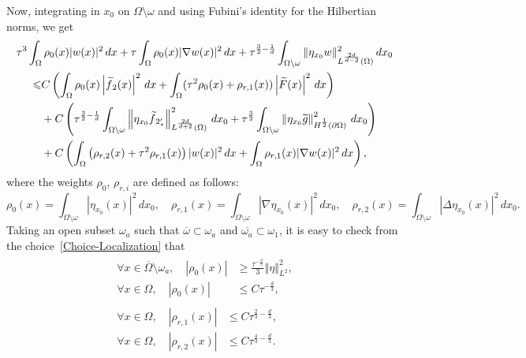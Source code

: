 \documentclass[10pt]{amsart}
\theoremstyle{definition}\newtheorem{defi}[theo]{Definition}\newtheorem{rema}[theo]{Remark}\newtheorem{exam}[theo]{Example}\newtheorem{exem}[theo]{Example}\newtheorem{nota}[theo]{Notation}
\newcommand{\norm}[1]{\left\Vert#1\right\Vert}
\renewcommand{\leq}{\leqslant}
\renewcommand{\geq}{\geqslant}
\renewcommand{\tilde}{\widetilde}
\let\oldtilde\tilde
\renewcommand*{\tilde}[1]{\mathchoice{\widetilde{#1}}{\widetilde{#1}}{\oldtilde{#1}}{\oldtilde{#1}}}
\let\oldforall\forall
\renewcommand*{\forall}{\mathrel{\oldforall}}
\begin{document}
Now, integrating in $x_0$ on $\Omega \setminus \omega$ and using Fubini's identity for the Hilbertian norms, we get
\begin{multline*}
\tau^3 \int_\Omega \rho_0(x) |w(x)|^2 \, dx +
\tau \int_\Omega \rho_0(x) |\nabla w(x)|^2 \, dx +
\tau^{\frac{3}{2}-\frac{1}{d}} \int_{\Omega \setminus \omega} \| \eta_{x_0} w \|_{L^{\frac{2d}{d-2}}(\Omega)}^2 \, dx_0
\\
\begin{aligned}
\leq&
C\left(
\int_\Omega \rho_0(x) \left|\tilde f_2(x)\right|^2\, dx +
\int_\Omega (\tau^2 \rho_0(x) + \rho_{r,1}(x)) \left|\tilde F(x)\right|^2\, dx
\right)
\\
&+ C
\left(
\tau^{\frac{3}{2}-\frac{1}{d}} \int_{\Omega \setminus \omega} \norm{\eta_{x_0} \tilde f_{2_*'} }_{L^{\frac{2d}{d+2}}(\Omega)}^2 \, dx_0 +
\tau^{\frac{3}{2}} \int_{\Omega \setminus \omega} \norm{ \eta_{x_0} \tilde g}_{H^{\frac{1}{2}}(\partial \Omega)}^2 \, dx_0
\right)
\\
& + C
\left(
\int_\Omega \left(\rho_{r,2}(x) + \tau^2 \rho_{r,1}(x)\right) |w(x)|^2 \, dx +
\int_\Omega \rho_{r,1}(x) |\nabla w(x)|^2 \, dx
\right),
\end{aligned}
\end{multline*}
where the weights $\rho_0$, $\rho_{r,i}$ are defined as follows:
\begin{equation*}
\rho_0(x) \!= \!\int_{\Omega \setminus \omega} \!\!\! |\eta_{x_0}(x)|^2 \, dx_0, \quad
\rho_{r,1}(x) \! =\! \int_{\Omega \setminus \omega} \!\!\!|\nabla \eta_{x_0}(x)|^2 \, dx_0,
\quad
\rho_{r,2}(x) \! = \!\int_{\Omega \setminus \omega}\!\!\! |\Delta \eta_{x_0}(x)|^2 \, dx_0.
\end{equation*}
Taking an open subset $\omega_a$ such that $\overline\omega \subset \omega_a$ and $\overline{\omega_a} \subset \omega_1$, it is easy to check from the choice~\eqref{Choice-Localization} that
\begin{align}
\begin{aligned}\label{Est-rho-0-above}
\forall x \in \overline{\Omega} \setminus \omega_a,\quad  |\rho_0(x) | &\geq \frac{\tau^{-\frac{d}{3}}}{3} \norm{\eta}_{L^2}^2,
\\
\forall x \in \Omega, \quad  |\rho_{0}(x)| &\leq C \tau^{- \frac{d}{3}},
\end{aligned}
\\
\begin{aligned}\label{Est-rho-2-above}
\forall x \in \Omega, \quad  |\rho_{r,1}(x)| &\leq C \tau^{\frac{2}{3} - \frac{d}{3}},
\\
\forall x \in \Omega, \quad  |\rho_{r,2}(x)| &\leq C \tau^{\frac{4}{3} - \frac{d}{3}}.
\end{aligned}
\end{align}
\end{document}
